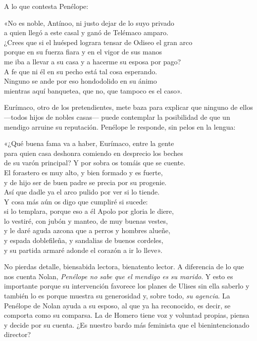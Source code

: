 A lo que contesta Penélope:

\begin{versocita}
«No es noble, Antínoo, ni justo dejar de lo suyo privado\\
a quien llegó a este casal y ganó de Telémaco amparo.\\
¿Crees que si el huésped lograra tensar de Odiseo el gran arco\\
porque en su fuerza fiara y en el vigor de sus manos\\
me iba a llevar a su casa y a hacerme su esposa por pago?\\
A fe que ni él en su pecho está tal cosa esperando.\\
Ninguno se ande por eso hondodolido en su ánimo\\
mientras aquí banquetea, que no, que tampoco es el caso».
\end{versocita}

Eurímaco, otro de los pretendientes, mete baza para explicar que ninguno de ellos ---todos hijos de nobles casas--- puede contemplar la posibilidad de que un mendigo arruine su reputación. Penélope le responde, sin pelos en la lengua:

\begin{versocita}
«¿Qué buena fama va a haber, Eurímaco, entre la gente\\
para quien casa deshonra comiendo en desprecio los beches\\
de su varón principal? Y por sobra os tomáis que se cuente.\\
El forastero es muy alto, y bien formado y es fuerte,\\
y de hijo ser de buen padre se precia por su progenie.\\
Así que dadle ya el arco pulido por ver si lo tiende.\\
Y cosa más aún os digo que cumpliré si sucede:\\
si lo templara, porque eso a él Apolo por gloria le diere,\\
lo vestiré, con jubón y manteo, de muy buenas vestes,\\
y le daré aguda azcona que a perros y hombres alueñe,\\
y espada doblefileña, y sandalias de buenos cordeles,\\
y su partida armaré adonde el corazón a ir lo lleve».
\end{versocita}

No pierdas detalle, biensabida lectora, bienatento lector. A diferencia de lo que nos cuenta Nolan, \emph{Penélope no sabe que el mendigo es su marido}. Y esto es importante porque su intervención favorece los planes de Ulises sin ella saberlo y también lo es porque muestra su generosidad y, sobre todo, \emph{su agencia}. La Penélope de Nolan ayuda a su esposo, al que ya ha reconocido, es decir, se comporta como su comparsa. La de Homero tiene voz y voluntad propias, piensa y decide por su cuenta. ¿Es nuestro bardo más feminista que el bienintencionado director?

